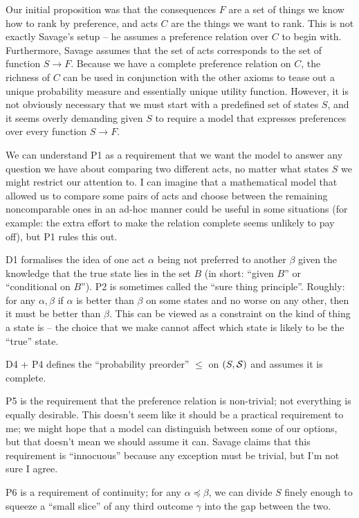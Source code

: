 Our initial proposition was that the consequences $F$ are a set of things we know how to rank by preference, and acts $C$ are the things we want to rank. This is not exactly Savage's setup -- he assumes a preference relation over $C$ to begin with. Furthermore, Savage assumes that the set of acts corresponds to the set of function $S\to F$. Because we have a complete preference relation on $C$, the richness of $C$ can be used in conjunction with the other axioms to tease out a unique probability measure and essentially unique utility function. However, it is not obviously necessary that we must start with a predefined set of states $S$, and it seems overly demanding given $S$ to require a model that expresses preferences over every function $S\to F$. 

We can understand P1 as a requirement that we want the model to answer any question we have about comparing two different acts, no matter what states $S$ we might restrict our attention to. I can imagine that a mathematical model that allowed us to compare some pairs of acts and choose between the remaining noncomparable ones in an ad-hoc manner could be useful in some situations (for example: the extra effort to make the relation complete seems unlikely to pay off), but P1 rules this out.

D1 formalises the idea of one act $\alpha$ being not preferred to another $\beta$ given the knowledge that the true state lies in the set $B$ (in short: ``given $B$'' or ``conditional on $B$''). P2 is sometimes called the ``sure thing principle''. Roughly: for any $\alpha, \beta$ if $\alpha$ is better than $\beta$ on some states and no worse on any other, then it must be better than $\beta$. This can be viewed as a constraint on the kind of thing a state is -- the choice that we make cannot affect which state is likely to be the ``true'' state.

D4 + P4 defines the ``probability preorder'' $\leqslant$ on $(S,\mathcal{S})$ and assumes it is complete.

P5 is the requirement that the preference relation is non-trivial; not everything is equally desirable. This doesn't seem like it should be a practical requirement to me; we might hope that a model can distinguish between some of our options, but that doesn't mean we should assume it can. Savage claims that this requirement is ``innocuous'' because any exception must be trivial, but I'm not sure I agree.

P6 is a requirement of continuity; for any $\alpha\preceq \beta$, we can divide $S$ finely enough to squeeze a ``small slice'' of any third outcome $\gamma$ into the gap between the two.

